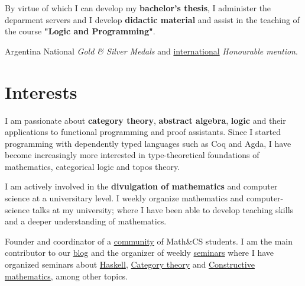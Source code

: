 \documentclass[nocolors]{friggeri-cv-a4}
\begin{document}
\begin{entrylist}

  {By virtue of which I can develop my \textbf{bachelor's thesis}, I administer the deparment
    servers and I develop \textbf{didactic material} and assist in the teaching of the course
    \textbf{"Logic and Programming"}.
  }

  
{Argentina}
{National \emph{Gold \& Silver Medals} and
  \href{https://www.imo-official.org/team_r.aspx?code=ESP&year=2012}{international} \emph{Honourable mention}.}


\end{entrylist}

\section{Interests}

I am passionate about \textbf{category theory}, \textbf{abstract algebra},
\textbf{logic} and their applications to functional
  programming and proof assistants. Since I started programming with dependently typed
languages such as Coq and Agda, I have become increasingly more
interested in type-theoretical foundations of mathematics, categorical
logic and topos theory.

I am actively involved in the \textbf{divulgation of mathematics} and
computer science at a universitary level. I weekly organize
mathematics and computer-science talks at my university; where I have
been able to develop teaching skills and a deeper understanding of
mathematics.

\begin{entrylist}
  { Founder and coordinator of a
    \href{http://libreim.github.io/}{community} of Math\&CS students.
    I am the main contributor to our
    \href{http://libreim.github.io/blog/}{blog} and the organizer of
    weekly
    \href{http://libreim.github.io/dgiim/awesome/seminars/}{seminars}
    where I have organized seminars about
    \href{https://github.com/libreim/haskell}{Haskell},
    \href{https://github.com/libreim/introCategorias/blob/master/categorias.pdf}{Category
      theory} and
    \href{https://github.com/mroman42/libreim-constructiva/blob/master/constructiva.pdf}{Constructive mathematics}, among other topics. }

\end{entrylist}
\end{document}
